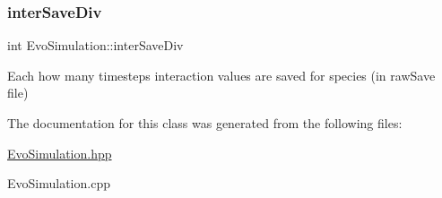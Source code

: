 \subsubsection{\texorpdfstring{inter\+Save\+Div}{interSaveDiv}}
{\footnotesize\ttfamily int Evo\+Simulation\+::inter\+Save\+Div\hspace{0.3cm}{\ttfamily [protected]}}

Each how many timesteps interaction values are saved for species (in raw\+Save file) 

The documentation for this class was generated from the following files\+:\begin{DoxyCompactItemize}
\item 
\hyperlink{EvoSimulation_8hpp}{Evo\+Simulation.\+hpp}\item 
Evo\+Simulation.\+cpp\end{DoxyCompactItemize}
